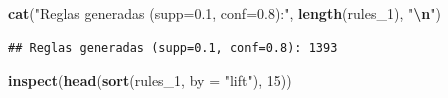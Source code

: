 \documentclass[
]{article}
\newenvironment{Shaded}{\begin{snugshade}}{\end{snugshade}}
\newcommand{\AttributeTok}[1]{\textcolor[rgb]{0.13,0.29,0.53}{#1}}
\newcommand{\DecValTok}[1]{\textcolor[rgb]{0.00,0.00,0.81}{#1}}
\newcommand{\FunctionTok}[1]{\textcolor[rgb]{0.13,0.29,0.53}{\textbf{#1}}}
\newcommand{\NormalTok}[1]{#1}
\newcommand{\SpecialCharTok}[1]{\textcolor[rgb]{0.81,0.36,0.00}{\textbf{#1}}}
\newcommand{\StringTok}[1]{\textcolor[rgb]{0.31,0.60,0.02}{#1}}
\begin{document}
\begin{Shaded}
\begin{Highlighting}[]
\FunctionTok{cat}\NormalTok{(}\StringTok{"Reglas generadas (supp=0.1, conf=0.8):"}\NormalTok{, }\FunctionTok{length}\NormalTok{(rules\_1), }\StringTok{"}\SpecialCharTok{\textbackslash{}n}\StringTok{"}\NormalTok{)}
\end{Highlighting}
\end{Shaded}

\begin{verbatim}
## Reglas generadas (supp=0.1, conf=0.8): 1393
\end{verbatim}

\begin{Shaded}
\begin{Highlighting}[]
\FunctionTok{inspect}\NormalTok{(}\FunctionTok{head}\NormalTok{(}\FunctionTok{sort}\NormalTok{(rules\_1, }\AttributeTok{by =} \StringTok{"lift"}\NormalTok{), }\DecValTok{15}\NormalTok{))}
\end{Highlighting}
\end{Shaded}
\end{document}
